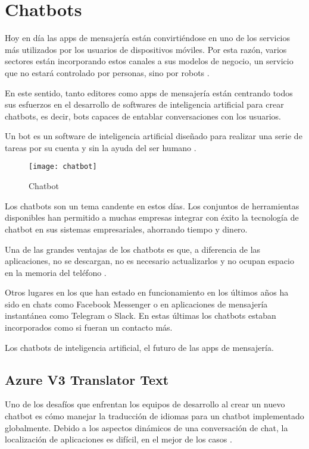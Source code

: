 \section{Chatbots}

Hoy en día las apps de mensajería están convirtiéndose en uno de los servicios más utilizados por los usuarios de dispositivos móviles. Por esta razón, varios sectores están incorporando estos canales a sus modelos de negocio, un servicio que no estará controlado por personas, sino por robots \cite{chatbot2}.

En este sentido, tanto editores como apps de mensajería están centrando todos sus esfuerzos en el desarrollo de softwares de inteligencia artificial para crear chatbots, es decir, bots capaces de entablar conversaciones con los usuarios.

Un bot es un software de inteligencia artificial diseñado para realizar una serie de tareas por su cuenta y sin la ayuda del ser humano \cite{chatbot1}.

\begin{figure}[htp!]
  \centering
  \texttt{[image: chatbot]}
  \caption{Chatbot}
  \label{fig:chatbot}
\end{figure}

Los chatbots son un tema candente en estos días. Los conjuntos de herramientas disponibles han permitido a muchas empresas integrar con éxito la tecnología de chatbot en sus sistemas empresariales, ahorrando tiempo y dinero.

Una de las grandes ventajas de los chatbots es que, a diferencia de las aplicaciones, no se descargan, no es necesario actualizarlos y no ocupan espacio en la memoria del teléfono \cite{chatbot3}.

Otros lugares en los que han estado en funcionamiento en los últimos años ha sido en chats como Facebook Messenger o en aplicaciones de mensajería instantánea como Telegram o Slack. En estas últimas los chatbots estaban incorporados como si fueran un contacto más.

Los chatbots de inteligencia artificial, el futuro de las apps de mensajería.

\subsection{Azure V3 Translator Text}

Uno de los desafíos que enfrentan los equipos de desarrollo al crear un nuevo chatbot es cómo manejar la traducción de idiomas para un chatbot implementado globalmente. Debido a los aspectos dinámicos de una conversación de chat, la localización de aplicaciones es difícil, en el mejor de los casos \cite{chatbot4}.


